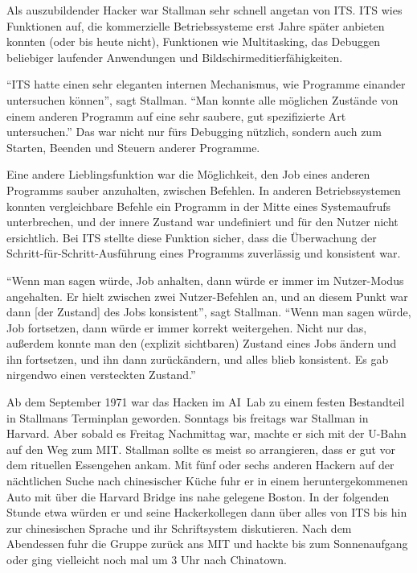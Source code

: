 Als auszubildender Hacker war Stallman sehr schnell angetan von ITS. ITS wies Funktionen auf, die kommerzielle Betriebssysteme erst Jahre später anbieten konnten (oder bis heute nicht), Funktionen wie Multitasking, das Debuggen beliebiger laufender Anwendungen und Bildschirmeditierfähigkeiten. 

"`ITS hatte einen sehr eleganten internen Mechanismus, wie Programme einander untersuchen können"', sagt Stallman. "`Man konnte alle möglichen Zustände von einem anderen Programm auf eine sehr saubere, gut spezifizierte Art untersuchen."' Das war nicht nur fürs Debugging nützlich, sondern auch zum Starten, Beenden und Steuern anderer Programme.

Eine andere Lieblingsfunktion war die Möglichkeit, den Job eines anderen Programms sauber anzuhalten, zwischen Befehlen. In anderen Betriebssystemen konnten vergleichbare Befehle ein Programm in der Mitte eines Systemaufrufs unterbrechen, und der innere Zustand war undefiniert und für den Nutzer nicht ersichtlich. Bei ITS stellte diese Funktion sicher, dass die Überwachung der Schritt-für-Schritt-Ausführung eines Programms zuverlässig und konsistent war.

"`Wenn man sagen würde, \glq Job anhalten\grq, dann würde er immer im Nutzer-Modus angehalten. Er hielt zwischen zwei Nutzer-Befehlen an, und an diesem Punkt war dann [der Zustand] des Jobs konsistent"', sagt Stallman. "`Wenn man sagen würde, \glq Job fortsetzen\grq, dann würde er immer korrekt weitergehen. Nicht nur das, außerdem konnte man den (explizit sichtbaren) Zustand eines Jobs ändern und ihn fortsetzen, und ihn dann zurückändern, und alles blieb konsistent. Es gab nirgendwo einen versteckten Zustand."'

Ab dem September 1971 war das Hacken im AI~Lab zu einem festen Bestandteil in Stallmans Terminplan geworden. Sonntags bis freitags war Stallman in Harvard. Aber sobald es Freitag Nachmittag war, machte er sich mit der U-Bahn auf den Weg zum MIT. Stallman sollte es meist so arrangieren, dass er gut vor dem rituellen Essengehen ankam. Mit fünf oder sechs anderen Hackern auf der nächtlichen Suche nach chinesischer Küche fuhr er in einem heruntergekommenen Auto mit über die Harvard Bridge ins nahe gelegene Boston. In der folgenden Stunde etwa würden er und seine Hackerkollegen dann über alles von ITS bis hin zur chinesischen Sprache und ihr Schriftsystem diskutieren. Nach dem Abendessen fuhr die Gruppe zurück ans MIT und hackte bis zum Sonnenaufgang oder ging vielleicht noch mal um 3 Uhr nach Chinatown.

